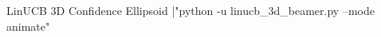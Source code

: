 \documentclass{beamer}
\begin{document}
\begin{frame}[fragile]{LinUCB 3D Confidence Ellipsoid}
    \centering
    |"python -u linucb_3d_beamer.py --mode animate"
\end{frame}
\end{document}
